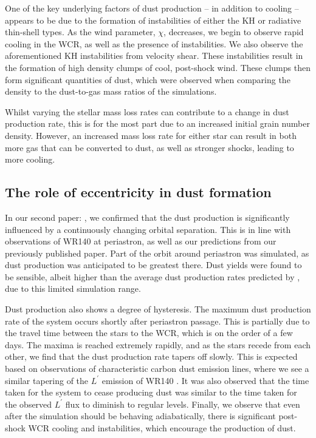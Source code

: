 One of the key underlying factors of dust production -- in addition to cooling -- appears to be due to the formation of instabilities of either the KH or radiative thin-shell types.
As the wind parameter, $\chi$, decreases, we begin to observe rapid cooling in the WCR, as well as the presence of instabilities.
We also observe the aforementioned KH instabilities from velocity shear.
These instabilities result in the formation of high density clumps of cool, post-shock wind.
These clumps then form significant quantities of dust, which were observed when comparing the density to the dust-to-gas mass ratios of the simulations.

Whilst varying the stellar mass loss rates can contribute to a change in dust production rate, this is for the most part due to an increased initial grain number density.
However, an increased mass loss rate for either star can result in both more gas that can be converted to dust, as well as stronger shocks, leading to more cooling.

\subsection{The role of eccentricity in dust formation}

In our second paper: \emph{\secondpapertitle}, we confirmed that the dust production is significantly influenced by a continuously changing orbital separation.
This is in line with observations of WR140 at periastron, as well as our predictions from our previously published paper.
Part of the orbit around periastron was simulated, as dust production was anticipated to be greatest there.
Dust yields were found to be sensible, albeit higher than the average dust production rates predicted by \textcite{lauRevisitingImpactDust2020}, due to this limited simulation range.

Dust production also shows a degree of hysteresis.
The maximum dust production rate of the system occurs shortly after periastron passage.
This is partially due to the travel time between the stars to the WCR, which is on the order of a few days.
The maxima is reached extremely rapidly, and as the stars recede from each other, we find that the dust production rate tapers off slowly.
This is expected based on observations of characteristic carbon dust emission lines, where we see a similar tapering of the $L^\prime$ emission of WR140 \parencite{crowther_dust_2003}.
It was also observed that the time taken for the system to cease producing dust was similar to the time taken for the observed $L^\prime$ flux to diminish to regular levels.
Finally, we observe that even after the simulation should be behaving adiabatically, there is significant post-shock WCR cooling and instabilities, which encourage the production of dust.

